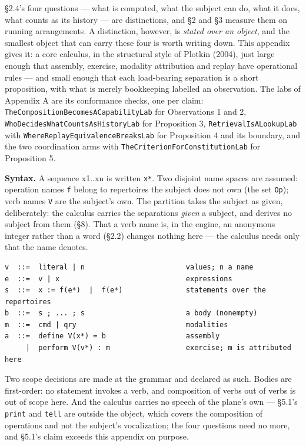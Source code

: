 \documentclass[
]{article}
\newcounter{none} %
\begin{document}
§2.4's four questions --- what is computed, what the subject can do,
what it does, what counts as its history --- are distinctions, and §2
and §3 measure them on running arrangements. A distinction, however, is
\emph{stated over an object}, and the smallest object that can carry
these four is worth writing down. This appendix gives it: a core
calculus, in the structural style of Plotkin (2004), just large enough
that assembly, exercise, modality attribution and replay have
operational rules --- and small enough that each load-bearing separation
is a short proposition, with what is merely bookkeeping labelled an
observation. The labs of Appendix A are its conformance checks, one per
claim: \texttt{TheCompositionBecomesACapabilityLab} for Observations 1
and 2, \texttt{WhoDecidesWhatCountsAsHistoryLab} for Proposition 3,
\texttt{RetrievalIsALookupLab} with
\texttt{WhereReplayEquivalenceBreaksLab} for Proposition 4 and its
boundary, and the two coordination arms with
\texttt{TheCriterionForConstitutionLab} for Proposition 5.

\textbf{Syntax.} A sequence x1..xn is written \texttt{x*}. Two disjoint
name spaces are assumed: operation names \texttt{f} belong to
repertoires the subject does not own (the set \texttt{Op}); verb names
\texttt{V} are the subject's own. The partition takes the subject as
given, deliberately: the calculus carries the separations \emph{given} a
subject, and derives no subject from them (§8). That a verb name is, in
the engine, an anonymous integer rather than a word (§2.2) changes
nothing here --- the calculus needs only that the name denotes.

\begin{verbatim}
v  ::=  literal | n                        values; n a name
e  ::=  v | x                              expressions
s  ::=  x := f(e*)  |  f(e*)               statements over the repertoires
b  ::=  s ; ... ; s                        a body (nonempty)
m  ::=  cmd | qry                          modalities
a  ::=  define V(x*) = b                   assembly
     |  perform V(v*) : m                  exercise; m is attributed here
\end{verbatim}

Two scope decisions are made at the grammar and declared as such. Bodies
are first-order: no statement invokes a verb, and composition of verbs
out of verbs is out of scope here. And the calculus carries no speech of
the plane's own --- §5.1's \texttt{print} and \texttt{tell} are outside
the object, which covers the composition of operations and not the
subject's vocalization; the four questions need no more, and §5.1's
claim exceeds this appendix on purpose.
\end{document}
